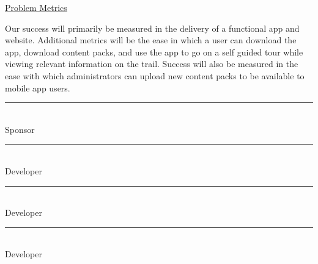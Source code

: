 \documentclass[letterpaper,10pt,titlepage]{article}
\begin{document}
\begin{center}
\underline{Problem Metrics}\\
\vspace{0.3cm}
\end{center}

Our success will primarily be measured in the delivery of a functional app and website. Additional metrics will be the ease in which a user can download the app, download content packs, and use the app to go on a self guided tour while viewing relevant information on the trail. Success will also be measured in the ease with which administrators can upload new content packs to be available to mobile app users.\\
\vspace{1.5cm}

\newpage
\textbf{ }
\vspace{5.0cm}

\noindent\rule{13cm}{0.4pt}\\
Sponsor
\vspace{3.0cm}

\noindent\rule{13cm}{0.4pt}\\
Developer
\vspace{3.0cm}


\noindent\rule{13cm}{0.4pt}\\
Developer
\vspace{3.0cm}


\noindent\rule{13cm}{0.4pt}\\
Developer
\vspace{3.0cm}
\end{document}
